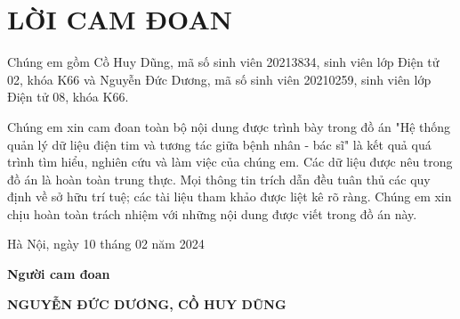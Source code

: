 \section*{LỜI CAM ĐOAN} %
\thispagestyle{empty}

Chúng em gồm Cồ Huy Dũng, mã số sinh viên 20213834, sinh viên lớp Điện tử 02, khóa K66 và Nguyễn Đức Dương, mã số sinh viên 20210259, sinh viên lớp Điện tử 08, khóa K66.

Chúng em xin cam đoan toàn bộ nội dung được trình bày trong đồ án "Hệ thống quản lý dữ liệu điện tim và tương tác giữa bệnh nhân - bác sĩ" 
là kết quả quá trình tìm hiểu, nghiên cứu và làm việc của chúng em. Các dữ liệu được nêu trong đồ án là hoàn toàn trung thực. 
Mọi thông tin trích dẫn đều tuân thủ các quy định về sở hữu trí tuệ; các tài liệu tham khảo được liệt kê rõ ràng. 
Chúng em xin chịu hoàn toàn trách nhiệm với những nội dung được viết trong đồ án này.


\vspace{6pt}

\hspace{8cm}Hà Nội, ngày 10 tháng 02 năm 2024

\hspace{9cm}\textbf{Người cam đoan}

\vspace{2cm}
\hspace{7cm}\textbf{NGUYỄN ĐỨC DƯƠNG,  CỒ HUY DŨNG}

\cleardoublepage